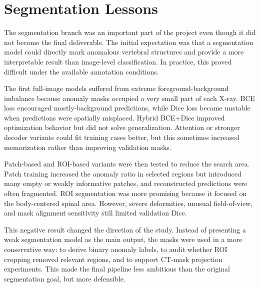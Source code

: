 \section{Segmentation Lessons}
The segmentation branch was an important part of the project even though it did not become the final deliverable. The initial expectation was that a segmentation model could directly mark anomalous vertebral structures and provide a more interpretable result than image-level classification. In practice, this proved difficult under the available annotation conditions.

The first full-image models suffered from extreme foreground-background imbalance because anomaly masks occupied a very small part of each X-ray. BCE loss encouraged mostly-background predictions, while Dice loss became unstable when predictions were spatially misplaced. Hybrid BCE+Dice improved optimization behavior but did not solve generalization. Attention or stronger decoder variants could fit training cases better, but this sometimes increased memorization rather than improving validation masks.

Patch-based and ROI-based variants were then tested to reduce the search area. Patch training increased the anomaly ratio in selected regions but introduced many empty or weakly informative patches, and reconstructed predictions were often fragmented. ROI segmentation was more promising because it focused on the body-centered spinal area. However, severe deformities, unusual field-of-view, and mask alignment sensitivity still limited validation Dice.

This negative result changed the direction of the study. Instead of presenting a weak segmentation model as the main output, the masks were used in a more conservative way: to derive binary anomaly labels, to audit whether ROI cropping removed relevant regions, and to support CT-mask projection experiments. This made the final pipeline less ambitious than the original segmentation goal, but more defensible.

